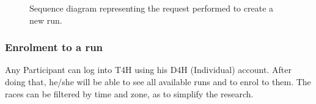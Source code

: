             \begin{figure}[H]
                \centering
                \caption{Sequence diagram representing the request performed to create a new run.}
                \label{fig:T4R-run-organization}
            \end{figure}
            
        \subsubsection{Enrolment to a run}
            Any Participant can log into T4H using his D4H (Individual) account. After doing that, he/she will be able to see all available runs and to enrol to them. The races can be filtered by time and zone, as to simplify the research.
            
